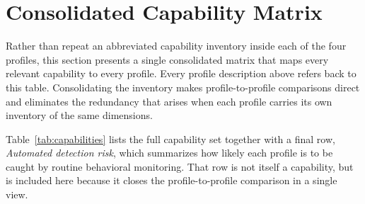 \documentclass[12pt, a4paper]{report}
\begin{document}
\newpage
\section{Consolidated Capability Matrix}
\label{sec:capability-matrix}

Rather than repeat an abbreviated capability inventory inside each of the
four profiles, this section presents a single consolidated matrix that
maps every relevant capability to every profile. Every profile description
above refers back to this table. Consolidating the inventory makes
profile-to-profile comparisons direct and eliminates the redundancy that
arises when each profile carries its own inventory of the same dimensions.

Table~\ref{tab:capabilities} lists the full capability set together with
a final row, \emph{Automated detection risk}, which summarizes how likely
each profile is to be caught by routine behavioral monitoring. That row
is not itself a capability, but is included here because it closes the
profile-to-profile comparison in a single view.

\vspace{0.4cm}
\end{document}
